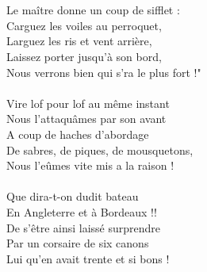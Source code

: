 \\\\Le maître donne un coup de sifflet : ~~~~\bissimple
\\Carguez les voiles au perroquet, ~~~~~~~ \bissimple
\\Larguez les ris et vent arrière,
\\Laissez porter jusqu'à son bord,
\\Nous verrons bien qui s'ra le plus fort !"
\\\\Vire lof pour lof au même instant ~~~~~\bissimple
\\Nous l'attaquâmes par son avant ~~\bissimple
\\A coup de haches d'abordage
\\De sabres, de piques, de mousquetons,
\\Nous l'eûmes vite mis a la raison !
\\\\Que dira-t-on dudit bateau ~~~~~~~\bissimple
\\En Angleterre et à Bordeaux !! ~ \bissimple
\\De s'être ainsi laissé surprendre
\\Par un corsaire de six canons
\\Lui qu'en avait trente et si bons !

\breakpage